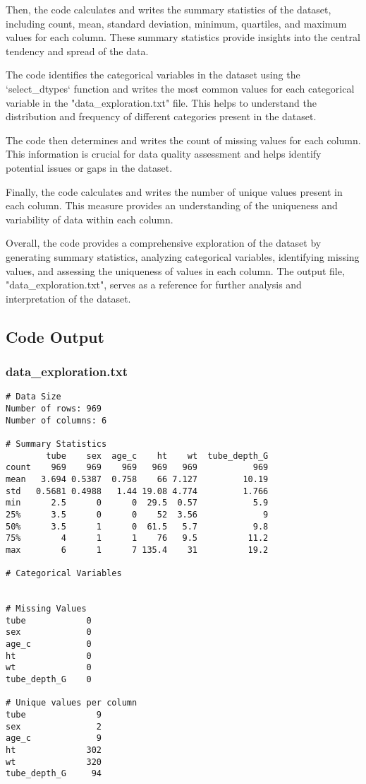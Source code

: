 \documentclass[11pt]{article}
\begin{document}
Then, the code calculates and writes the summary statistics of the dataset, including count, mean, standard deviation, minimum, quartiles, and maximum values for each column. These summary statistics provide insights into the central tendency and spread of the data.

The code identifies the categorical variables in the dataset using the `select\_dtypes` function and writes the most common values for each categorical variable in the "data\_exploration.txt" file. This helps to understand the distribution and frequency of different categories present in the dataset.

The code then determines and writes the count of missing values for each column. This information is crucial for data quality assessment and helps identify potential issues or gaps in the dataset.

Finally, the code calculates and writes the number of unique values present in each column. This measure provides an understanding of the uniqueness and variability of data within each column.

Overall, the code provides a comprehensive exploration of the dataset by generating summary statistics, analyzing categorical variables, identifying missing values, and assessing the uniqueness of values in each column. The output file, "data\_exploration.txt", serves as a reference for further analysis and interpretation of the dataset.

\subsection{Code Output}

\subsubsection*{data\_exploration.txt}

\begin{Verbatim}[tabsize=4]
# Data Size
Number of rows: 969
Number of columns: 6

# Summary Statistics
        tube    sex  age_c    ht    wt  tube_depth_G
count    969    969    969   969   969           969
mean   3.694 0.5387  0.758    66 7.127         10.19
std   0.5681 0.4988   1.44 19.08 4.774         1.766
min      2.5      0      0  29.5  0.57           5.9
25%      3.5      0      0    52  3.56             9
50%      3.5      1      0  61.5   5.7           9.8
75%        4      1      1    76   9.5          11.2
max        6      1      7 135.4    31          19.2

# Categorical Variables


# Missing Values
tube            0
sex             0
age_c           0
ht              0
wt              0
tube_depth_G    0

# Unique values per column
tube              9
sex               2
age_c             9
ht              302
wt              320
tube_depth_G     94


\end{Verbatim}
\end{document}
